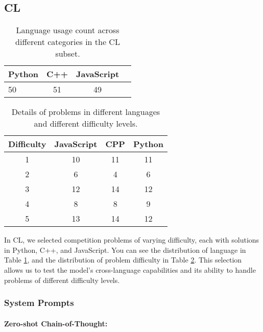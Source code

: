 \subsection{CL}

\begin{table}[!ht]
  \centering
  \caption{Language usage count across different categories in the CL subset.}
  \label{tab:cl_language_usage}
  \begin{tabular}{lccc}
      \toprule
      Python & C++ & JavaScript \\
      \midrule
       50     & 51  & 49         \\
      \bottomrule
  \end{tabular}
\end{table}

\begin{table}[!ht]
  \centering
  \caption{Details of problems in different languages and different difficulty levels.}
  \label{tab:stat:2}
      \begin{tabular}{cccc}
\toprule
\textbf{Difficulty} & JavaScript & CPP & Python \\
\midrule
1 & 10 & 11 & 11 \\
2 & 6 & 4 & 6 \\
3 & 12 & 14 & 12 \\
4 & 8 & 8 & 9 \\
5 & 13 & 14 & 12 \\
\bottomrule
\end{tabular}
\end{table}

In CL, we selected competition problems of varying difficulty, each with solutions in Python, C++, and JavaScript. You can see the distribution of language in Table \ref{tab:cl_language_usage}, and the distribution of problem difficulty in Table \ref{tab:stat:2}. This selection allows us to test the model's cross-language capabilities and its ability to handle problems of different difficulty levels.

% 

\subsubsection{System Prompts}


\paragraph{Zero-shot Chain-of-Thought:}

